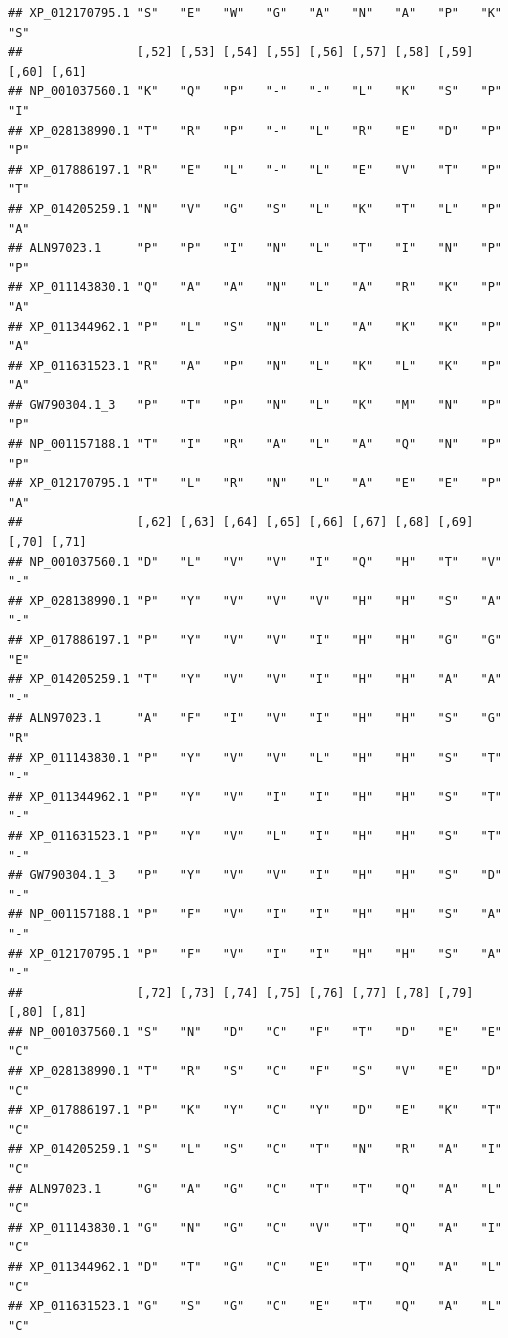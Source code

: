 \documentclass[]{article}
\begin{document}
\begin{verbatim}
## XP_012170795.1 "S"   "E"   "W"   "G"   "A"   "N"   "A"   "P"   "K"   "S"  
##                [,52] [,53] [,54] [,55] [,56] [,57] [,58] [,59] [,60] [,61]
## NP_001037560.1 "K"   "Q"   "P"   "-"   "-"   "L"   "K"   "S"   "P"   "I"  
## XP_028138990.1 "T"   "R"   "P"   "-"   "L"   "R"   "E"   "D"   "P"   "P"  
## XP_017886197.1 "R"   "E"   "L"   "-"   "L"   "E"   "V"   "T"   "P"   "T"  
## XP_014205259.1 "N"   "V"   "G"   "S"   "L"   "K"   "T"   "L"   "P"   "A"  
## ALN97023.1     "P"   "P"   "I"   "N"   "L"   "T"   "I"   "N"   "P"   "P"  
## XP_011143830.1 "Q"   "A"   "A"   "N"   "L"   "A"   "R"   "K"   "P"   "A"  
## XP_011344962.1 "P"   "L"   "S"   "N"   "L"   "A"   "K"   "K"   "P"   "A"  
## XP_011631523.1 "R"   "A"   "P"   "N"   "L"   "K"   "L"   "K"   "P"   "A"  
## GW790304.1_3   "P"   "T"   "P"   "N"   "L"   "K"   "M"   "N"   "P"   "P"  
## NP_001157188.1 "T"   "I"   "R"   "A"   "L"   "A"   "Q"   "N"   "P"   "P"  
## XP_012170795.1 "T"   "L"   "R"   "N"   "L"   "A"   "E"   "E"   "P"   "A"  
##                [,62] [,63] [,64] [,65] [,66] [,67] [,68] [,69] [,70] [,71]
## NP_001037560.1 "D"   "L"   "V"   "V"   "I"   "Q"   "H"   "T"   "V"   "-"  
## XP_028138990.1 "P"   "Y"   "V"   "V"   "V"   "H"   "H"   "S"   "A"   "-"  
## XP_017886197.1 "P"   "Y"   "V"   "V"   "I"   "H"   "H"   "G"   "G"   "E"  
## XP_014205259.1 "T"   "Y"   "V"   "V"   "I"   "H"   "H"   "A"   "A"   "-"  
## ALN97023.1     "A"   "F"   "I"   "V"   "I"   "H"   "H"   "S"   "G"   "R"  
## XP_011143830.1 "P"   "Y"   "V"   "V"   "L"   "H"   "H"   "S"   "T"   "-"  
## XP_011344962.1 "P"   "Y"   "V"   "I"   "I"   "H"   "H"   "S"   "T"   "-"  
## XP_011631523.1 "P"   "Y"   "V"   "L"   "I"   "H"   "H"   "S"   "T"   "-"  
## GW790304.1_3   "P"   "Y"   "V"   "V"   "I"   "H"   "H"   "S"   "D"   "-"  
## NP_001157188.1 "P"   "F"   "V"   "I"   "I"   "H"   "H"   "S"   "A"   "-"  
## XP_012170795.1 "P"   "F"   "V"   "I"   "I"   "H"   "H"   "S"   "A"   "-"  
##                [,72] [,73] [,74] [,75] [,76] [,77] [,78] [,79] [,80] [,81]
## NP_001037560.1 "S"   "N"   "D"   "C"   "F"   "T"   "D"   "E"   "E"   "C"  
## XP_028138990.1 "T"   "R"   "S"   "C"   "F"   "S"   "V"   "E"   "D"   "C"  
## XP_017886197.1 "P"   "K"   "Y"   "C"   "Y"   "D"   "E"   "K"   "T"   "C"  
## XP_014205259.1 "S"   "L"   "S"   "C"   "T"   "N"   "R"   "A"   "I"   "C"  
## ALN97023.1     "G"   "A"   "G"   "C"   "T"   "T"   "Q"   "A"   "L"   "C"  
## XP_011143830.1 "G"   "N"   "G"   "C"   "V"   "T"   "Q"   "A"   "I"   "C"  
## XP_011344962.1 "D"   "T"   "G"   "C"   "E"   "T"   "Q"   "A"   "L"   "C"  
## XP_011631523.1 "G"   "S"   "G"   "C"   "E"   "T"   "Q"   "A"   "L"   "C"  

\end{verbatim}
\end{document}
